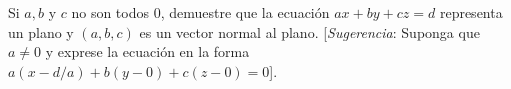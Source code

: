 \item Si $a, b$ y $c$ no son todos $0$, demuestre que la ecuación $ax + by + cz = d$ representa un plano y $(a, b, c)$ es un vector normal al plano. [\textit{Sugerencia}: Suponga que $a \neq 0$ y exprese la ecuación en la forma $a(x - d/a) + b(y - 0) + c(z - 0) = 0$].

